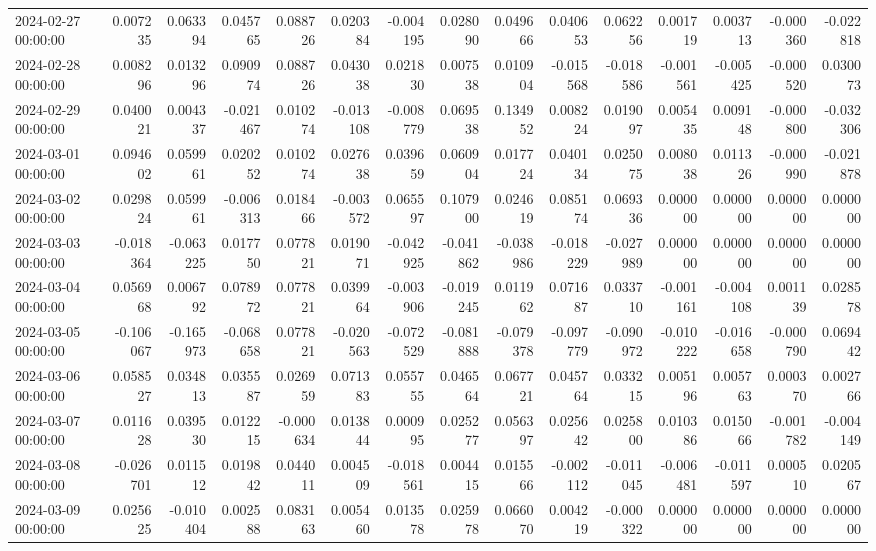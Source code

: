 \begin{tabular}{lrrrrrrrrrrrrrr}
2024-02-27 00:00:00 & 0.007235 & 0.063394 & 0.045765 & 0.088726 & 0.020384 & -0.004195 & 0.028090 & 0.049666 & 0.040653 & 0.062256 & 0.001719 & 0.003713 & -0.000360 & -0.022818 \\
2024-02-28 00:00:00 & 0.008296 & 0.013296 & 0.090974 & 0.088726 & 0.043038 & 0.021830 & 0.007538 & 0.010904 & -0.015568 & -0.018586 & -0.001561 & -0.005425 & -0.000520 & 0.030073 \\
2024-02-29 00:00:00 & 0.040021 & 0.004337 & -0.021467 & 0.010274 & -0.013108 & -0.008779 & 0.069538 & 0.134952 & 0.008224 & 0.019097 & 0.005435 & 0.009148 & -0.000800 & -0.032306 \\
2024-03-01 00:00:00 & 0.094602 & 0.059961 & 0.020252 & 0.010274 & 0.027638 & 0.039659 & 0.060904 & 0.017724 & 0.040134 & 0.025075 & 0.008038 & 0.011326 & -0.000990 & -0.021878 \\
2024-03-02 00:00:00 & 0.029824 & 0.059961 & -0.006313 & 0.018466 & -0.003572 & 0.065597 & 0.107900 & 0.024619 & 0.085174 & 0.069336 & 0.000000 & 0.000000 & 0.000000 & 0.000000 \\
2024-03-03 00:00:00 & -0.018364 & -0.063225 & 0.017750 & 0.077821 & 0.019071 & -0.042925 & -0.041862 & -0.038986 & -0.018229 & -0.027989 & 0.000000 & 0.000000 & 0.000000 & 0.000000 \\
2024-03-04 00:00:00 & 0.056968 & 0.006792 & 0.078972 & 0.077821 & 0.039964 & -0.003906 & -0.019245 & 0.011962 & 0.071687 & 0.033710 & -0.001161 & -0.004108 & 0.001139 & 0.028578 \\
2024-03-05 00:00:00 & -0.106067 & -0.165973 & -0.068658 & 0.077821 & -0.020563 & -0.072529 & -0.081888 & -0.079378 & -0.097779 & -0.090972 & -0.010222 & -0.016658 & -0.000790 & 0.069442 \\
2024-03-06 00:00:00 & 0.058527 & 0.034813 & 0.035587 & 0.026959 & 0.071383 & 0.055755 & 0.046564 & 0.067721 & 0.045764 & 0.033215 & 0.005196 & 0.005763 & 0.000370 & 0.002766 \\
2024-03-07 00:00:00 & 0.011628 & 0.039530 & 0.012215 & -0.000634 & 0.013844 & 0.000995 & 0.025277 & 0.056397 & 0.025642 & 0.025800 & 0.010386 & 0.015066 & -0.001782 & -0.004149 \\
2024-03-08 00:00:00 & -0.026701 & 0.011512 & 0.019842 & 0.044011 & 0.004509 & -0.018561 & 0.004415 & 0.015566 & -0.002112 & -0.011045 & -0.006481 & -0.011597 & 0.000510 & 0.020567 \\
2024-03-09 00:00:00 & 0.025625 & -0.010404 & 0.002588 & 0.083163 & 0.005460 & 0.013578 & 0.025978 & 0.066070 & 0.004219 & -0.000322 & 0.000000 & 0.000000 & 0.000000 & 0.000000 \\

\end{tabular}
